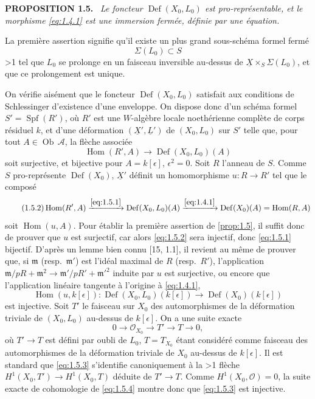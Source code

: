 \documentclass[10pt]{article}
\makeatletter
\DeclareMathOperator{\Def}{Def}
\DeclareMathOperator{\Spf}{Spf}
\DeclareMathOperator{\Hom}{Hom}
\DeclareMathOperator{\Ob}{Ob}
\newcommand{\UX}{\underline{X}}
\newcommand{\UL}{\underline{L}}
\newcommand{\sourceanchor}[2]{\begingroup\def\@currentlabel{#2}\label{#1}\endgroup}
\newenvironment{sourcestatement}[3]{\par\smallskip\noindent\textbf{#1 #2.}\sourceanchor{#3}{#2}\ \itshape}{\par\normalfont\smallskip}
\newcommand{\DPage}[2]{\ifnum#1>1\clearpage\fi\setcounter{page}{#2}}
\makeatother
\begin{document}
\begin{sourcestatement}{PROPOSITION}{1.5}{prop:1.5}
Le foncteur $\Def(X_0, L_0)$ est pro-représentable, et le morphisme \eqref{eq:1.4.1} est une immersion fermée, définie par une équation.
\end{sourcestatement}

La première assertion signifie qu'il existe un plus grand sous-schéma formel fermé
\begin{equation}\tag{1.5.0}\label{eq:1.5.0}
\Sigma(L_0) \subset S
\end{equation}
\DPage{4}{61}
tel que $L_0$ se prolonge en un faisceau inversible au-dessus de $\UX \times_S \Sigma(L_0)$, et que ce prolongement est unique.

On vérifie aisément que le foncteur $\Def(X_0, L_0)$ satisfait aux conditions de Schlessinger d'existence d'une enveloppe. On dispose donc d'un schéma formel $S' = \Spf(R')$, où $R'$ est une $W$-algèbre locale noethérienne complète de corps résiduel $k$, et d'une déformation $(\UX', \UL')$ de $(X_0, L_0)$ sur $S'$ telle que, pour tout $A \in \Ob\,\mathcal{A}$, la flèche associée
\begin{equation}\tag{1.5.1}\label{eq:1.5.1}
\Hom(R', A) \to \Def(X_0, L_0)(A)
\end{equation}
soit surjective, et bijective pour $A = k[\epsilon]$, $\epsilon^2 = 0$. Soit $R$ l'anneau de $S$. Comme $S$ pro-représente $\Def(X_0)$, $\UX'$ définit un homomorphisme $u: R \to R'$ tel que le composé
\begin{equation}\tag{1.5.2}\label{eq:1.5.2}
\Hom(R', A) \xrightarrow{\eqref{eq:1.5.1}} \Def(X_0, L_0)(A) \xrightarrow{\eqref{eq:1.4.1}} \Def(X_0)(A) = \Hom(R, A)
\end{equation}
soit $\Hom(u, A)$. Pour établir la première assertion de \ref{prop:1.5}, il suffit donc de prouver que $u$ est surjectif, car alors \eqref{eq:1.5.2} sera injectif, donc \eqref{eq:1.5.1} bijectif. D'après un lemme bien connu [15, 1.1], il revient au même de prouver que, si $\mathfrak{m}$ (resp.~$\mathfrak{m}'$) est l'idéal maximal de $R$ (resp.~$R'$), l'application $\mathfrak{m}/pR + \mathfrak{m}^2 \to \mathfrak{m}'/pR' + \mathfrak{m}'^2$ induite par $u$ est surjective, ou encore que l'application linéaire tangente à l'origine à \eqref{eq:1.4.1},
\begin{equation}\tag{1.5.3}\label{eq:1.5.3}
\Hom(u, k[\epsilon]): \Def(X_0, L_0)(k[\epsilon]) \to \Def(X_0)(k[\epsilon])
\end{equation}
est injective. Soit $T'$ le faisceau sur $X_0$ des automorphismes de la déformation triviale de $(X_0, L_0)$ au-dessus de $k[\epsilon]$. On a une suite exacte
\begin{equation}\tag{1.5.4}\label{eq:1.5.4}
0 \to \mathcal{O}_{X_0} \to T' \to T \to 0,
\end{equation}
où $T' \to T$ est défini par oubli de $L_0$, $T = T_{X_0}$ étant considéré comme faisceau des automorphismes de la déformation triviale de $X_0$ au-dessus de $k[\epsilon]$. Il est standard que \eqref{eq:1.5.3} s'identifie canoniquement à la
\DPage{5}{62}
flèche $H^1(X_0, T') \to H^1(X_0, T)$ déduite de $T' \to T$. Comme $H^1(X_0, \mathcal{O}) = 0$, la suite exacte de cohomologie de \eqref{eq:1.5.4} montre donc que \eqref{eq:1.5.3} est injective.
\end{document}
